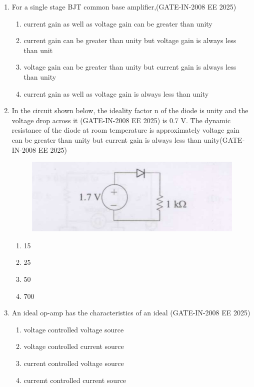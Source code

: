 \documentclass[journal,12pt,onecolumn]{IEEEtran}
\theoremstyle{remark}
\begin{document}
\begin{enumerate}[label=Q.\arabic*,start=1]
    \item For a single stage BJT common base amplifier,(GATE-IN-2008 EE 2025)
    \begin{enumerate} 
        \item current gain as well as voltage gain can be greater than unity
        \item current gain can be greater than unity but voltage gain is always less than unit 
        \item voltage gain can be greater than unity but current gain is always less than unity 
        \item current gain as well as voltage gain is always less than unity
    \end{enumerate}
    
    \item In the circuit shown below, the ideality factor n of the diode is unity and the voltage drop across it (GATE-IN-2008 EE 2025)
is 0.7 V. The dynamic resistance of the diode at room temperature is approximately  voltage gain can be greater than unity but current gain is always less than unity(GATE-IN-2008 EE 2025)

 \begin{figure}[H]
    \centering
    \includegraphics[width=0.5\linewidth]{figs/i3.jpg}
    \label{fig:q9_circuit}
\end{figure}
    \begin{enumerate} 
        \item 15 
        \item 25
        \item 50 
        \item 700
    \end{enumerate}
    
    \item An ideal op-amp has the characteristics of an ideal (GATE-IN-2008 EE 2025)
    \begin{enumerate} 
        \item voltage controlled voltage source
        \item voltage controlled current source 
        \item current controlled voltage source 
        \item curremt controlled current source
    \end{enumerate}
    

\end{enumerate}
\end{document}
